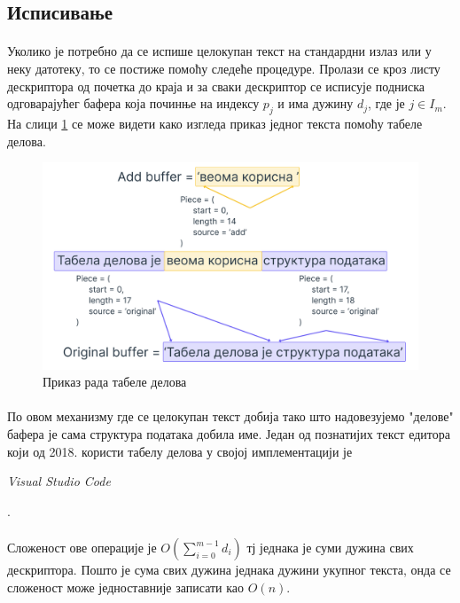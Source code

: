 \documentclass[12pt,oneside]{memoir}
\begin{document}
\subsection{Исписивање}
\paragraph{}
Уколико је потребно да се испише целокупан текст на стандардни излаз или у неку датотеку,
то се постиже помоћу следеће процедуре. Пролази се кроз листу дескриптора од почетка до краја
и за сваки дескриптор се исписује подниска одговарајућег бафера која починње на индексу 
\(p_j\) и има дужину \(d_j\), где је \(j \in I_m\). На слици \ref{fig:piece_table} се може
видети како изгледа приказ једног текста помоћу табеле делова.

\begin{figure}[!ht]
	\centering
	\includegraphics[width=1.0\textwidth]{images/piece_table_1.png}
	\caption{Приказ рада табеле делова}
	\label{fig:piece_table}
\end{figure}

\paragraph{}
По овом механизму где се целокупан текст добија тако што надовезујемо "делове" бафера је сама
структура података добила име. Један од познатијих текст едитора који од 2018. 
користи табелу делова у својој имплементацији је \begin{latinica}\textit{Visual Studio Code}\end{latinica} \cite{VSC}.

\paragraph{}
Сложеност ове операције је \(O(\sum_{i=0}^{m-1} d_i)\) тј једнака је суми
дужина свих дескриптора. Пошто је сума свих дужина једнака дужини укупног текста, онда
се сложеност може једноставније записати као \(O(n)\).
\end{document}
